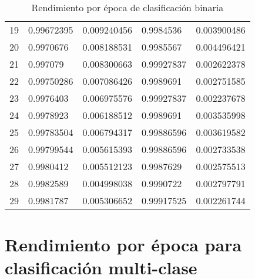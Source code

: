 \begin{table}[H]
{\begin{tabular}{@{}lllll@{}}
    19 & 0.99672395 & 0.009240456 & 0.9984536 & 0.003900486 \\
    20 & 0.9970676 & 0.008188531 & 0.9985567 & 0.004496421 \\
    21 & 0.997079 & 0.008300663 & 0.99927837 & 0.002622378 \\
    22 & 0.99750286 & 0.007086426 & 0.9989691 & 0.002751585 \\
    23 & 0.9976403 & 0.006975576 & 0.99927837 & 0.002237678 \\
    24 & 0.9978923 & 0.006188512 & 0.9989691 & 0.003535998 \\
    25 & 0.99783504 & 0.006794317 & 0.99886596 & 0.003619582 \\
    26 & 0.99799544 & 0.005615393 & 0.99886596 & 0.002733538 \\
    27 & 0.9980412 & 0.005512123 & 0.9987629 & 0.002575513 \\
    28 & 0.9982589 & 0.004998038 & 0.9990722 & 0.002797791 \\
    29 & 0.9981787 & 0.005306652 & 0.99917525 & 0.002261744 \\ \bottomrule
    \end{tabular}%
    }
    \caption{Rendimiento por época de clasificación binaria}
    \label{tabla:rendimiento:final}
    \end{table}

    \section{Rendimiento por época para clasificación multi-clase}

